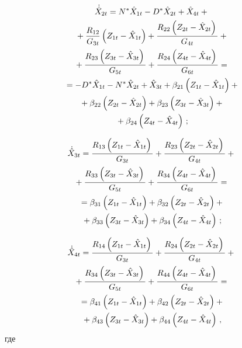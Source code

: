 \begin{multicols}{2}
    \vspace*{-12pt}
    
    \noindent
    \begin{multline*}
   \dot{\hat X}_{2t} = N^* \hat X_{1t} - 
   D^*\hat X_{2t} +\hat X_{4t}+{}\\
   {}+ \displaystyle\frac{\displaystyle R_{12}\mathstrut}{\displaystyle G_{3t}\mathstrut} \left(Z_{1t} -\hat X_{1t}\right)
+ \displaystyle\frac{\displaystyle R_{22}  \left(Z_{2t} -\hat X_{2t}\right)\mathstrut}{\displaystyle G_{4t}\mathstrut}+{}\\
{}+ \displaystyle\frac{\displaystyle R_{23}\left(Z_{3t} -\hat X_{3t}\right)\mathstrut}{\displaystyle G_{5t}\mathstrut}+\displaystyle\frac{\displaystyle R_{24}  \left(Z_{4t} -\hat X_{4t}\right)\mathstrut}{\displaystyle G_{6t}\mathstrut}={}\\
{}=- D^* \hat X_{1t} - N^*\hat X_{2t} +\hat X_{3t}+ \beta_{21} \left(Z_{1t} -\hat X_{1t}\right)+ {}\\
{}+\beta_{22} \left(Z_{2t} -\hat X_{2t}\right)+\beta_{23}
    \left(Z_{3t} -\hat X_{3t}\right)+{}\\
    {}+\beta_{24} \left(Z_{4t} -\hat X_{4t}\right)\,;
    \end{multline*}
    
    \vspace*{-12pt}

    \noindent
    \begin{multline*}
   \dot{\hat X}_{3t} =  \displaystyle\frac{\displaystyle R_{13} \left(Z_{1t} -\hat X_{1t}\right)\mathstrut}{\displaystyle G_{3t}\mathstrut}+ 
   \displaystyle\frac{\displaystyle R_{23} \left(Z_{2t} -\hat X_{2t}\right)\mathstrut}{\displaystyle G_{4t}\mathstrut}+{}\\
   {}+ \displaystyle\frac{\displaystyle R_{33} \left(Z_{3t} -\hat X_{3t}\right)\mathstrut}{\displaystyle G_{5t}\mathstrut}+
   \displaystyle\frac{\displaystyle R_{34}  \left(Z_{4t} -\hat X_{4t}\right)\mathstrut}{\displaystyle G_{6t}\mathstrut}={}\\
{}= \beta_{31} \left(Z_{1t} -\hat X_{1t}\right)+ \beta_{32} \left(Z_{2t} -\hat X_{2t}\right)+{}\\
{}+\beta_{33}     \left(Z_{3t} -\hat X_{3t}\right)
+\beta_{34} \left(Z_{4t} -\hat X_{4t}\right)\,;
    \end{multline*}
    
    \vspace*{-12pt}
    
    \noindent
\begin{multline*}
   \dot{\hat X}_{4t} =  \displaystyle\frac{\displaystyle R_{14}  \left(Z_{1t} -\hat X_{1t}\right)\mathstrut}{\displaystyle G_{3t}\mathstrut}+ 
   \displaystyle\frac{\displaystyle R_{24} \left(Z_{2t} -\hat X_{2t}\right)\mathstrut}{\displaystyle G_{4t}\mathstrut}+{}\\
   {}+ \displaystyle\frac{\displaystyle R_{34} \left(Z_{3t} -\hat X_{3t}\right)\mathstrut}{\displaystyle G_{5t}\mathstrut}+
   \displaystyle\frac{\displaystyle R_{44}  \left(Z_{4t} -\hat X_{4t}\right)\mathstrut}{\displaystyle G_{6t}\mathstrut}={}\\
{}= \beta_{41} \left(Z_{1t} -\hat X_{1t}\right)+ \beta_{42} \left(Z_{2t} -\hat X_{2t}\right)+{}\\
{}+\beta_{43}     \left(Z_{3t} -\hat X_{3t}\right)
+\beta_{44} \left(Z_{4t} -\hat X_{4t}\right)\,,
    \label{e69sin}
    \end{multline*}
где


\end{multicols}
